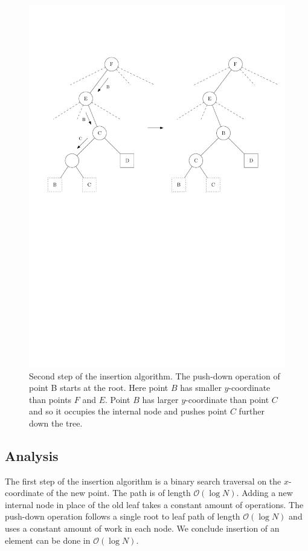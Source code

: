 \documentclass[twoside,11pt,openright]{report}
\begin{document}
\begin{figure}[H]
	\centering
		\includegraphics[width=1.0\textwidth]{../figures/internal_pst_insert_step2}
	\caption{Second step of the insertion algorithm. The push-down operation of point B starts at the root. Here point $B$ has smaller $y$-coordinate than points $F$ and $E$. Point $B$ has larger $y$-coordinate than point $C$ and so it occupies the internal node and pushes point $C$ further down the tree.}
	\label{fig:dynamic_pst_insert_step2}
\end{figure}

\subsection*{Analysis}

The first step of the insertion algorithm is a binary search traversal on the $x$-coordinate of the new point. The path is of length $\mathcal{O}(\log N)$. Adding a new internal node in place of the old leaf takes a constant amount of operations. The push-down operation follows a single root to leaf path of length $\mathcal{O}(\log N)$ and uses a constant amount of work in each node. We conclude insertion of an element can be done in $\mathcal{O}(\log N)$.
\end{document}
